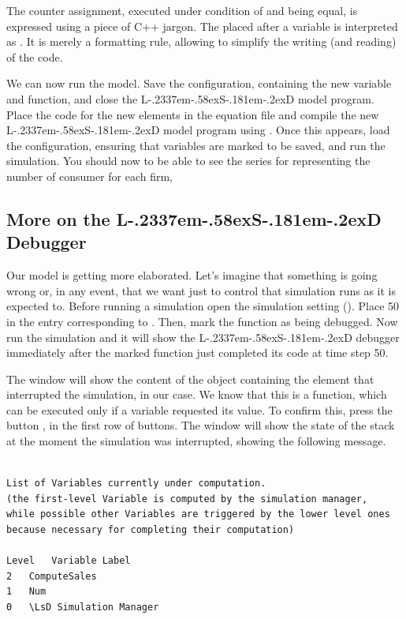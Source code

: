 \documentclass [11pt,a4paper] {book}
\def\LsD{{L\kern-.2337em\lower-.58ex\hbox{S}\kern-.181em\lower-.2ex\hbox{D}}\xspace}
\begin{document}
The counter assignment, executed under condition of  and  being equal, is expressed using a piece of C++ jargon. The \code{++} placed after a variable is interpreted as . It is merely a formatting rule, allowing to simplify the writing (and reading) of the code. 

We can now run the model. Save the configuration, containing the new variable and function, and close the \LsD model program. Place the code for the new elements in the equation file and compile the new \LsD model program using . Once this appears, load the configuration, ensuring that variables  are marked to be saved, and run the simulation. You should now to be able to see the series for  representing the number of consumer for each firm,


\subsection{More on the \LsD Debugger}
Our model is getting more elaborated. Let's imagine that something is going wrong or, in any event, that we want just to control that simulation runs as it is expected to. Before running a simulation open the simulation setting (). Place 50 in the entry corresponding to . Then, mark the function  as being debugged. Now run the simulation and it will show the \LsD debugger immediately after the marked function just completed its code at time step 50.

The window will show the content of the object containing the element that interrupted the simulation,  in our case. We know that this is a function, which can be executed only if a variable  requested its value. To confirm this, press the button , in the first row of buttons. The  window will show the state of the stack at the moment the simulation was interrupted, showing the following message.

\begin{minipage}[h]{10cm}
\small
\begin{verbatim}

List of Variables currently under computation.
(the first-level Variable is computed by the simulation manager, 
while possible other Variables are triggered by the lower level ones 
because necessary for completing their computation)

Level	Variable Label
2	ComputeSales
1	Num
0	\LsD Simulation Manager

\end{verbatim}
\normalsize
\end{minipage}
\end{document}
